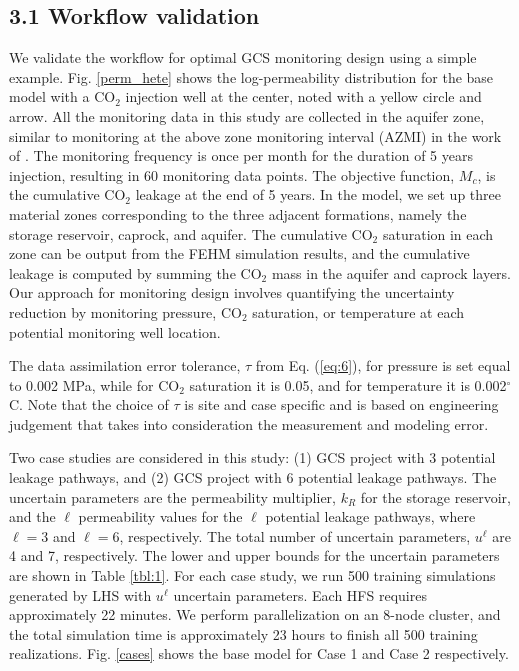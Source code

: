 \documentclass[10pt, twoside]{article}
\begin{document}
\subsection*{3.1 Workflow validation}
We validate the workflow for optimal GCS monitoring design using a simple example. Fig. \ref{perm_hete} shows the log-permeability distribution for the base model with a CO$_2$ injection well at the center, noted with a yellow circle and arrow. All the monitoring data in this study are collected in the aquifer zone, similar to monitoring at the above zone monitoring interval (AZMI) in the work of \citet{Sun2013}. The monitoring frequency is once per month for the duration of 5 years injection, resulting in 60 monitoring data points. The objective function, $M_c$, is the cumulative CO$_2$ leakage at the end of 5 years. In the model, we set up three material zones corresponding to the three adjacent formations, namely the storage reservoir, caprock, and aquifer. The cumulative CO$_2$ saturation in each zone can be output from the FEHM simulation results, and the cumulative leakage is computed by summing the CO$_2$ mass in the aquifer and caprock layers. Our approach for monitoring design involves quantifying the uncertainty reduction by monitoring pressure, CO$_2$ saturation, or temperature at each potential monitoring well location. 

The data assimilation error tolerance, $\tau$ from Eq. (\ref{eq:6}), for pressure is set equal to 0.002 MPa, while for CO$_2$ saturation it is 0.05, and for temperature it is 0.002$^\circ$C. Note that the choice of $\tau$ is site and case specific and is based on engineering judgement that takes into consideration the measurement and modeling error.

Two case studies are considered in this study: (1) GCS project with 3 potential leakage pathways, and (2) GCS project with 6 potential leakage pathways. The uncertain parameters are the permeability multiplier, $k_R$ for the storage reservoir, and the $\ell$ permeability values for the $\ell$ potential leakage pathways, where $\ell=3$ and $\ell=6$, respectively. The total number of uncertain parameters, $u^\ell$ are 4 and 7, respectively. The lower and upper bounds for the uncertain parameters are shown in Table \ref{tbl:1}. For each case study, we run 500 training simulations generated by LHS with $u^\ell$ uncertain parameters. Each HFS requires approximately 22 minutes. We perform parallelization on an 8-node cluster, and the total simulation time is approximately 23 hours to finish all 500 training realizations. Fig. \ref{cases} shows the base model for Case 1 and Case 2 respectively.
\end{document}
